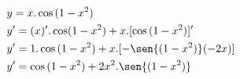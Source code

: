 \begin{ex}
\begin{align}
&y=x.\cos{(1-x^2)}\nonumber\\
&y'=(x)'.\cos(1-x^2)+x.[\cos{(1-x^2)}]'\nonumber\\
&y'=1.\cos{(1-x^2)}+x.[-\sen{(1-x^2)}(-2x)]\nonumber\\
&y'=\cos{(1-x^2)}+2x^2.\sen{(1-x^2)}\nonumber
\end{align}
\end{ex}